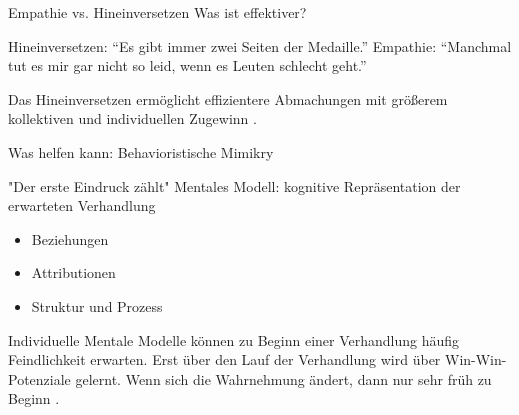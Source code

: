 \begin{frame}{Empathie vs. Hineinversetzen}
  Was ist effektiver?

  Hineinversetzen: \enquote{Es gibt immer zwei Seiten der Medaille.}
  Empathie: \enquote{Manchmal tut es mir gar nicht so leid, wenn es Leuten schlecht geht.}

  Das Hineinversetzen ermöglicht effizientere Abmachungen mit größerem kollektiven und individuellen Zugewinn \cite{galinsky_why_2008}.

  
  Was helfen kann: Behavioristische Mimikry \cite[][p. 500]{thompson_negotiation_2010}
\end{frame}

\begin{frame}{"Der erste Eindruck zählt"}
  Mentales Modell: kognitive Repräsentation der erwarteten Verhandlung \cite[][p. 287ff]{bazerman_negotiation_2000}
  \begin{itemize}
	\item Beziehungen
	\item Attributionen
	\item Struktur und Prozess
  \end{itemize}
  
	  Individuelle Mentale Modelle können zu Beginn einer Verhandlung häufig Feindlichkeit erwarten.
      Erst über den Lauf der Verhandlung wird über Win-Win-Potenziale gelernt. Wenn sich die Wahrnehmung ändert, dann nur sehr früh zu Beginn \cite{thompson_social_1990}
	  \cite[][p. 287ff]{bazerman_negotiation_2000}. 

\end{frame}


